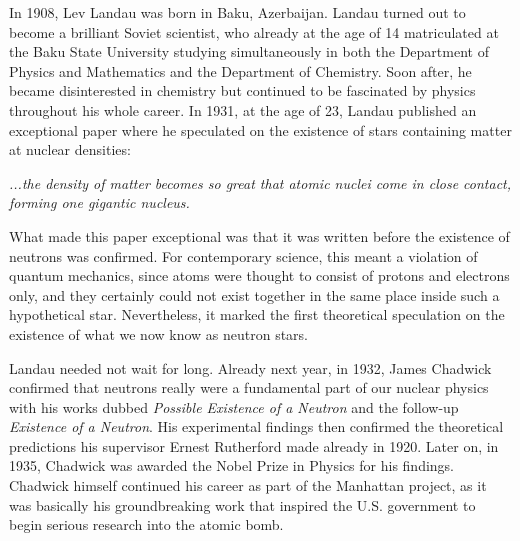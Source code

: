 In 1908, Lev Landau was born in Baku, Azerbaijan.
Landau turned out to become a brilliant Soviet scientist, who already at the age of 14 matriculated at the Baku State University studying simultaneously in both the Department of Physics and Mathematics and the Department of Chemistry.
Soon after, he became disinterested in chemistry but continued to be fascinated by physics throughout his whole career.
In 1931, at the age of 23, Landau published an exceptional paper where he speculated on the existence of stars containing matter at nuclear densities:\cite{Landau32}
\begin{displayquote}[L. Landau, 1939]
    \textit{...the density of matter becomes so great that atomic nuclei come in close contact, forming one gigantic nucleus.}
\end{displayquote}
What made this paper exceptional was that it was written before the existence of neutrons was confirmed. 
For contemporary science, this meant a violation of quantum mechanics, since atoms were thought to consist of protons and electrons only, and they certainly could not exist together in the same place inside such a hypothetical star.
Nevertheless, it marked the first theoretical speculation on the existence of what we now know as neutron stars.

Landau needed not wait for long.
Already next year, in 1932, James Chadwick confirmed that neutrons really were a fundamental part of our nuclear physics with his works dubbed \textit{Possible Existence of a Neutron}\cite{Chadwick32a} and the follow-up \textit{Existence of a Neutron}\cite{Chadwick32b}.
His experimental findings then confirmed the theoretical predictions his supervisor Ernest Rutherford made already in 1920\cite{Rutherford20}.
Later on,  in 1935, Chadwick was awarded the Nobel Prize in Physics for his findings.
Chadwick himself continued his career as part of the Manhattan project, as it was basically his groundbreaking work that inspired the U.S. government to begin serious research into the atomic bomb.


